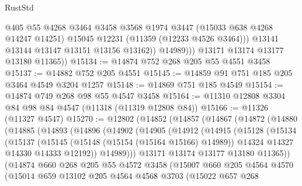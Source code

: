 \begin{lexlean}{RustStd}
\begin{coremodule}
{{{{{{{{{{{{{{{{{{{                    @405
                    @55
                    @4268
                    @3464
                    @3458
                    @3568
                    @1974
                    @3447
                    (@15033 @638 @4268 @14247 @14251)
                    @15045
                    @12231
                    (@11359 (@12233 @4526 @3464)))
                  @13141
                  @13144
                  @13147
                  @13151
                  @13156
                  @13162))
              @14989)))
        @13171
        @13174
        @13177
        @13180
        @11365))
@15134 := @14874 @752 @268 @205 @55 @4551 @3458
@15137 := @14882 @752 @205 @4551
@15145 := @14859 @91 @751 @185 @205 @3464 @4549 @3204 @1257
@15148 := @14869 @751 @185 @4549
@15154 := @14874 @749 @268 @98 @55 @4547 @3458
@15164 := @11310 @12808 @3304 @84 @98 @84 @4547 (@11318 (@11319 @12808 @84))
@15166 := @11326 (@11327 @4547)
@15270 := @12802
    (@14852
      (@14857
        (@14867
          (@14872
            (@14880
              (@14885
                (@14893
                  (@14896
                    (@14902
                      (@14905
                        (@14912
                          (@14915
                            (@15128
                              (@15134
                                (@15137
                                  (@15145
                                    (@15148 (@15154 (@15164 @15166) @14989))
                                    @14324
                                    @14327
                                    @14330
                                    @14333
                                    @12192))
                                @14989)))
                          @13171
                          @13174
                          @13177
                          @13180
                          @11365))
                      (@14874
                        @660
                        @268
                        @205
                        @55
                        @4572
                        @3458
                        (@15007
                          @660
                          @205
                          @4564
                          @4570
                          (@15014
                            @659
                            @13102
                            @205
                            @4564
                            @4568
                            @3703
                            (@15022
                              @657
                              @268
}}}}}}}}}}}}}}}}}}}
\end{coremodule}
\end{lexlean}
